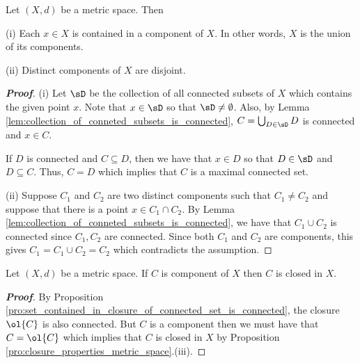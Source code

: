 \begin{theorem}
Let $(X,d)$ be a metric space. Then
\ben
\item [(i)] Each $x\in X$ is contained in a component of $X$. In other words, $X$ is the union of its components.
\item [(ii)] Distinct components of $X$ are disjoint.
\een
\end{theorem}

\begin{proof}[\bf Proof]
\ben
\item [(i)] Let $\sD$ be the collection of all connected subsets of $X$ which contains the given point $x$. Note that $x\in \sD$ so that $\sD\neq \emptyset$. Also, by Lemma \ref{lem:collection_of_conneted_subsets_is_connected}, $C = \bigcup_{D\in \sD} D$ is connected and $x\in C$.

If $D$ is connected and $C \subseteq D$, then we have that $x\in D$ so that $D\in \sD$ and $D\subseteq C$. Thus, $C = D$ which implies that $C$ is a maximal connected set.

\item [(ii)] Suppose $C_1$ and $C_2$ are two distinct components such that $C_1\neq C_2$ and suppose that there is a point $x\in C_1\cap C_2$. By Lemma \ref{lem:collection_of_conneted_subsets_is_connected}, we have that $C_1\cup C_2$ is connected since $C_1,C_2$ are connected. Since both $C_1$ and $C_2$ are components, this gives $C_1 = C_1\cup C_2 = C_2$ which contradicts the assumption.
\een
\end{proof}


\begin{proposition}
Let $(X,d)$ be a metric space. If $C$ is component of $X$ then $C$ is closed in $X$.
\end{proposition}

\begin{proof}[\bf Proof]
By Proposition \ref{pro:set_contained_in_closure_of_connected_set_is_connected}, the closure $\ol{C}$ is also connected. But $C$ is a component then we must have that $C = \ol{C}$ which implies that $C$ is closed in $X$ by Proposition \ref{pro:closure_properties_metric_space}.(iii).
\end{proof}





